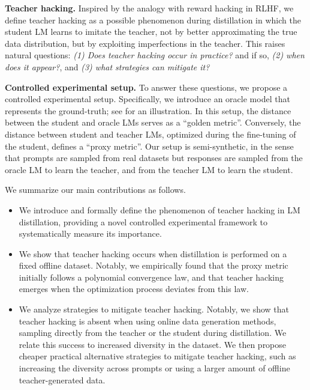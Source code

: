 \textbf{Teacher hacking.}
Inspired by the analogy with reward hacking in RLHF, we define teacher hacking as a possible phenomenon during distillation in which the student LM learns to imitate the teacher, not by better approximating the true data distribution, but by exploiting imperfections in the teacher.
This raises natural questions: \textit{(1) Does teacher hacking occur in practice?} and if so, \textit{(2) when does it appear?}, and \textit{(3) what strategies can mitigate it?}

\textbf{Controlled experimental setup.}
To answer these questions, we propose a controlled experimental setup. Specifically, we introduce an oracle model that represents the ground-truth; see  for an illustration. In this setup, the distance between the student and oracle LMs serves as a \enquote{golden metric}. Conversely, the distance between student and teacher LMs, optimized during the fine-tuning of the student, defines a \enquote{proxy metric}. 
Our setup is semi-synthetic, in the sense that prompts are sampled from real datasets but responses are sampled from the oracle LM to learn the teacher, and from the teacher LM to learn the student.

We summarize our main contributions as follows.
\begin{itemize}[topsep=0pt,itemsep=3pt,parsep=3pt,leftmargin=15pt]
\item
We introduce and formally define the phenomenon of teacher hacking in LM distillation, providing a novel controlled experimental framework to systematically measure its importance.
\item
We show that teacher hacking occurs when distillation is performed on a fixed offline dataset. Notably, we empirically found that the proxy metric initially follows a polynomial convergence law, and that teacher hacking emerges when the optimization process deviates from this law.
\item
We analyze strategies to mitigate teacher hacking.
Notably, we show that teacher hacking is absent when using online data generation methods, sampling directly from the teacher or the student during distillation. We relate this success to increased diversity in the dataset. We then propose cheaper practical alternative strategies to mitigate teacher hacking, such as increasing the diversity across prompts or using a larger amount of offline teacher-generated data.
\end{itemize}
